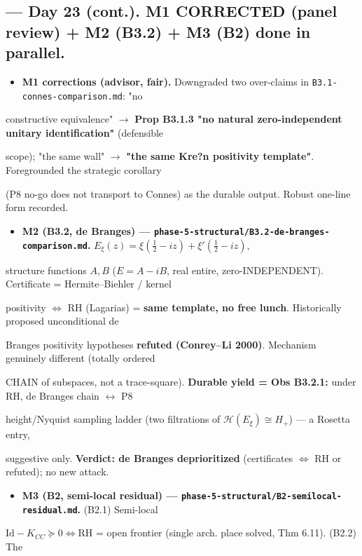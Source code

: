 \documentclass[10pt]{article}
\begin{document}
\subsection*{ --- Day 23 (cont.). M1 CORRECTED (panel review) + M2 (B3.2) + M3 (B2) done in parallel.}
\begin{itemize}
\item \textbf{M1 corrections (advisor, fair).} Downgraded two over-claims in \texttt{B3.1-connes-comparison.md}: "no
\end{itemize}
  constructive equivalence" \ensuremath{\to} \textbf{Prop B3.1.3 "no natural zero-independent unitary identification"} (defensible\par
  scope); "the same wall" \ensuremath{\to} \textbf{"the same Kre?n positivity template"}. Foregrounded the strategic corollary\par
  (P8 no-go does not transport to Connes) as the durable output. Robust one-line form recorded.\par
\begin{itemize}
\item \textbf{M2 (B3.2, de Branges) --- \texttt{phase-5-structural/B3.2-de-branges-comparison.md}.} $E_\xi(z)=\xi(\tfrac12-iz)+\xi'(\tfrac12-iz)$,
\end{itemize}
  structure functions $A,B$ ($E=A-iB$, real entire, zero-INDEPENDENT). Certificate = Hermite--Biehler / kernel\par
  positivity $\iff$ RH (Lagarias) = \textbf{same template, no free lunch}. Historically proposed unconditional de\par
  Branges positivity hypotheses \textbf{refuted (Conrey--Li 2000)}. Mechanism genuinely different (totally ordered\par
  CHAIN of subspaces, not a trace-square). \textbf{Durable yield = Obs B3.2.1:} under RH, de Branges chain \ensuremath{\leftrightarrow} P8\par
  height/Nyquist sampling ladder (two filtrations of $\mathcal H(E_\xi)\cong H_+$) --- a Rosetta entry,\par
  suggestive only. \textbf{Verdict: de Branges deprioritized} (certificates $\iff$ RH or refuted); no new attack.\par
\begin{itemize}
\item \textbf{M3 (B2, semi-local residual) --- \texttt{phase-5-structural/B2-semilocal-residual.md}.} (B2.1) Semi-local
\end{itemize}
  $\mathrm{Id}-K_{CC}\succeq0\iff$RH = open frontier (single arch. place solved, Thm 6.11). (B2.2) The\par
\end{document}
